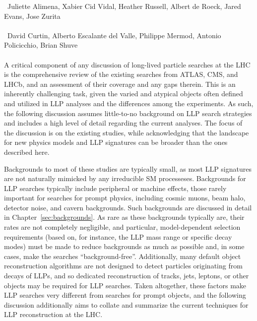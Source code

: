 ~Juliette Alimena, Xabier Cid Vidal, Heather Russell, Albert de Roeck, Jared Evans, Jose Zurita\\
\text{ \; }\\
~David Curtin, Alberto Escalante del Valle, Philippe Mermod, Antonio Policicchio, Brian Shuve\\
\text{ \; }\\


\noindent A critical component of any discussion of long-lived particle searches at the LHC is the comprehensive review of the existing searches from ATLAS, CMS, and LHCb, and an assessment of their coverage and any gaps therein. This is an inherently challenging task, given the varied and atypical objects often defined and utilized in LLP analyses and the differences among the experiments. As such, the following discussion assumes little-to-no background on LLP search strategies and includes a high level of detail regarding the current analyses. The focus of the discussion is on the existing studies, while acknowledging that the landscape for new physics models and LLP signatures can be broader than the ones described here.

Backgrounds to most of these studies are typically small, as most LLP signatures are not naturally mimicked by any irreducible SM processeses. Backgrounds for LLP searches typically include peripheral or machine effects, those rarely important for searches for prompt physics, including cosmic muons, beam halo, detector noise, and cavern backgrounds. Such backgrounds are discussed in detail in Chapter~\ref{sec:backgrounds}. As rare as these backgrounds typically are, their rates are not completely negligible, and particular, model-dependent selection requirements (based on, for instance, the LLP mass range or specific decay modes) must be made to reduce backgrounds as much as possible and, in some cases, make the searches ``background-free''. Additionally, many default object reconstruction algorithms are not designed to detect particles originating from decays of LLPs, and so dedicated reconstruction of tracks, jets, leptons, or other objects may be required for LLP searches. Taken altogether, these factors make LLP searches very different from searches for prompt objects, and the following discussion additionally aims to collate and summarize the current techniques for LLP reconstruction at the LHC.

